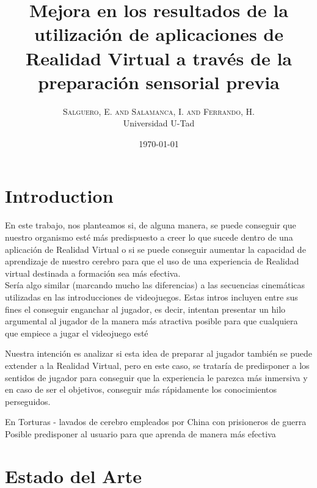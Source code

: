 \documentclass[twoside,twocolumn]{article}
\title{Mejora en los resultados de la utilizaci\'on de aplicaciones de Realidad Virtual a trav\'es de la preparaci\'on sensorial previa} %
\author{%
\textsc{Salguero, E. and Salamanca, I. and Ferrando, H.} \\%
\normalsize Universidad U-Tad \\ %
}
\date{\today} %
\begin{document}
\fancyhead{} %



\maketitle

\section{Introduction}

En este trabajo, nos planteamos si, de alguna manera, se puede conseguir que nuestro organismo est\'e m\'as predispuesto a creer lo que sucede dentro de una aplicaci\'on de Realidad Virtual o si se puede conseguir aumentar la capacidad de aprendizaje de nuestro cerebro para que el uso de una experiencia de Realidad virtual destinada a formaci\'on sea m\'as efectiva.\\

Sería algo similar (marcando mucho las diferencias) a las secuencias cinem\'aticas utilizadas en las introducciones de videojuegos. Estas intros incluyen entre sus fines el conseguir enganchar al jugador, es decir, intentan presentar un hilo argumental al jugador de la manera m\'as atractiva posible para que cualquiera que empiece a jugar el videojuego est\'e

Nuestra intenci\'on es analizar si esta idea de preparar al jugador tambi\'en se puede extender a la Realidad Virtual, pero en este caso, se tratar\'ia de predisponer a los sentidos de jugador para conseguir que la experiencia le parezca m\'as inmersiva y en caso de ser el objetivos, conseguir m\'as r\'apidamente los conocimientos perseguidos. 

En \cite{PrivacionSensorial} 
\noindent Torturas - lavados de cerebro empleados por China con prisioneros de guerra\\

\noindent Posible predisponer al usuario para que aprenda de manera m\'as efectiva\\




\section{Estado del Arte}
\end{document}
